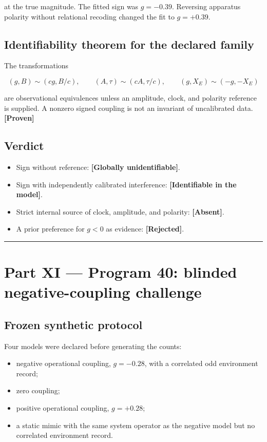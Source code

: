 \documentclass[11pt,a4paper,openany]{report}
\newcommand{\statusProven}{\textcolor{fingreen}{[Proven]}}
\begin{document}
at the true magnitude. The fitted sign was \(g=-0.39\). Reversing apparatus polarity without relational recoding changed the fit to \(g=+0.39\).

\section{Identifiability theorem for the declared family}

The transformations

\[
(g,B)\sim(cg,B/c),
\qquad
(A,\tau)\sim(cA,\tau/c),
\qquad
(g,X_E)\sim(-g,-X_E)
\]

are observational equivalences unless an amplitude, clock, and polarity reference is supplied. A nonzero signed coupling is not an invariant of uncalibrated data. \textbf{\statusProven{}}

\section{Verdict}

\begin{itemize}
\item 
Sign without reference: \textbf{[Globally unidentifiable]}.

\item 
Sign with independently calibrated interference: \textbf{[Identifiable in the model]}.

\item 
Strict internal source of clock, amplitude, and polarity: \textbf{[Absent]}.

\item 
A prior preference for \(g<0\) as evidence: \textbf{[Rejected]}.

\end{itemize}

\par\medskip\hrule\medskip

\chapter{Part XI — Program 40: blinded negative-coupling challenge}

\section{Frozen synthetic protocol}

Four models were declared before generating the counts:

\begin{itemize}
\item 
negative operational coupling, \(g=-0.28\), with a correlated odd environment record;

\item 
zero coupling;

\item 
positive operational coupling, \(g=+0.28\);

\item 
a static mimic with the same system operator as the negative model but no correlated environment record.

\end{itemize}
\end{document}
